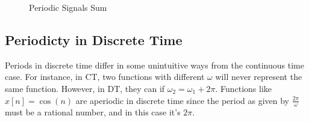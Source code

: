 \begin{figure}
    \centering
    \caption{Periodic Signals Sum}
\end{figure}

\subsection{Periodicty in Discrete Time}
Periods in discrete time differ in some 
unintuitive ways from the continuous time case. 
For instance, in CT, two functions with 
different $\omega$ will never represent 
the same function. However, in DT, they can 
if $\omega_2 = \omega_1 + 2\pi$. Functions like 
$x[n] = \cos(n)$ are aperiodic in discrete time 
since the period as given by $\frac{2\pi}\omega$
must be a rational number, and in this case it's 
$2\pi$. 